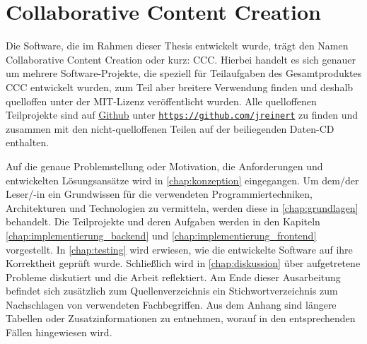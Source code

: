 \section{Collaborative Content Creation}
\label{sec:e_collaborative_content_creation}

Die Software, die im Rahmen dieser Thesis entwickelt wurde, trägt den Namen
Collaborative Content Creation oder kurz: CCC.  Hierbei handelt es sich genauer
um mehrere Software-Projekte, die speziell für Teilaufgaben des Gesamtproduktes
CCC entwickelt wurden, zum Teil aber breitere Verwendung finden und deshalb
quelloffen unter der MIT-Lizenz \cite{mit} veröffentlicht wurden.  Alle
quelloffenen Teilprojekte sind auf \href{https://github.com}{Github} unter
\texttt{\href{https://github.com/jreinert}{https://github.com/jreinert}} zu
finden und zusammen mit den nicht-quelloffenen Teilen auf der beiliegenden
Daten-CD enthalten.

Auf die genaue Problemstellung oder Motivation, die Anforderungen und
entwickelten Lösungsansätze wird in \cref{chap:konzeption} eingegangen.  Um
dem/der Leser/-in ein Grundwissen für die verwendeten Programmiertechniken,
Architekturen und Technologien zu vermitteln, werden diese in
\cref{chap:grundlagen} behandelt.  Die Teilprojekte und deren Aufgaben werden in
den Kapiteln \ref{chap:implementierung_backend} und
\ref{chap:implementierung_frontend} vorgestellt.  In \cref{chap:testing} wird
erwiesen, wie die entwickelte Software auf ihre Korrektheit geprüft wurde.
Schließlich wird in \cref{chap:diskussion} über aufgetretene Probleme diskutiert
und die Arbeit reflektiert.  Am Ende dieser Ausarbeitung befindet sich
zusätzlich zum Quellenverzeichnis ein Stichwortverzeichnis zum Nachschlagen von
verwendeten Fachbegriffen.  Aus dem Anhang sind längere Tabellen oder
Zusatzinformationen zu entnehmen, worauf in den entsprechenden Fällen
hingewiesen wird.
